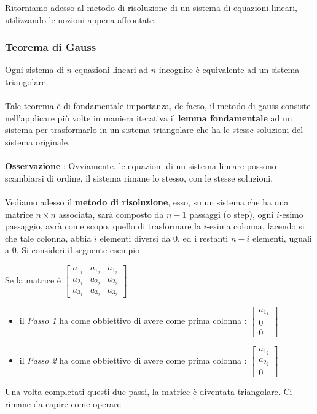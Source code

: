 \documentclass[12pt, letterpaper]{article}
\newcommand{\acc}{\\\hphantom{}\\}
\begin{document}
Ritorniamo adesso al metodo di risoluzione di un sistema di equazioni lineari, utilizzando le nozioni appena 
affrontate.\subsubsection{Teorema di Gauss}
Ogni sistema di \(n\) equazioni lineari ad \(n\) incognite è equivalente ad un sistema triangolare.\acc 
Tale teorema è di fondamentale importanza, de facto, il metodo di gauss consiste nell'applicare più volte 
in maniera iterativa il \textbf{lemma fondamentale} ad un sistema per trasformarlo in un sistema triangolare che 
ha le stesse soluzioni del sistema originale. \acc 
\textbf{Osservazione }: Ovviamente, le equazioni di un sistema lineare possono scambiarsi di ordine, il sistema 
rimane lo stesso, con le stesse soluzioni.\acc 
Vediamo adesso il \textbf{metodo di risoluzione}, esso, su un sistema che ha una matrice \(n\times n\) associata, sarà composto da \(n-1\)
 passaggi (o step), ogni \(i\)-esimo passaggio, avrà come scopo, quello di trasformare la \(i\)-esima colonna, 
 facendo si che tale colonna, abbia \(i\) elementi diversi da \(0\), ed i 
 restanti \(n-i\) elementi, uguali a 0. Si consideri il seguente esempio \begin{center}
    Se la matrice è 
    \(\begin{bmatrix}
       a_{1_1}&a_{1_2}&a_{1_3}\\
       a_{2_1}&a_{2_2}&a_{2_3}\\
       a_{3_1}&a_{3_2}&a_{3_3}
   \end{bmatrix}\)
 \end{center}
 \begin{itemize}
    \item il \textit{Passo 1} ha come obbiettivo di avere come prima colonna : \(\begin{bmatrix}
        a_{1_1}\\
        0\\
        0
    \end{bmatrix}\)
    \item il \textit{Passo 2} ha come obbiettivo di avere come prima colonna : \(\begin{bmatrix}
        a_{1_2}\\
        a_{2_2}\\
        0
    \end{bmatrix}\)
 \end{itemize}
Una volta completati questi due passi, la matrice è diventata triangolare. Ci rimane da capire come operare 
\end{document}
